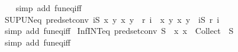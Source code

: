 \begin{isabellebody}
%
\isadelimproof
\ \ %
\endisadelimproof
%
\isatagproof
{}\isamarkupfalse%
\ {\isacharparenleft}{\kern0pt}simp\ add{\isacharcolon}{\kern0pt}\ fun{\isacharunderscore}{\kern0pt}eq{\isacharunderscore}{\kern0pt}iff{\isacharparenright}{\kern0pt}%
\endisatagproof
{\isafoldproof}%
%
\isadelimproof
\isanewline
%
\endisadelimproof
\isanewline
{}\isamarkupfalse%
\ SUP{\isacharunderscore}{\kern0pt}UN{\isacharunderscore}{\kern0pt}eq{}\ {\isacharbrackleft}{\kern0pt}pred{\isacharunderscore}{\kern0pt}set{\isacharunderscore}{\kern0pt}conv{\isacharbrackright}{\kern0pt}{\isacharcolon}{\kern0pt}\ {\isachardoublequoteopen}{\isacharparenleft}{\kern0pt}{\isasymSqunion}i{\isasymin}S{\isachardot}{\kern0pt}\ {\isacharparenleft}{\kern0pt}{\isasymlambda}x\ y{\isachardot}{\kern0pt}\ {\isacharparenleft}{\kern0pt}x{\isacharcomma}{\kern0pt}\ y{\isacharparenright}{\kern0pt}\ {\isasymin}\ r\ i{\isacharparenright}{\kern0pt}{\isacharparenright}{\kern0pt}\ {\isacharequal}{\kern0pt}\ {\isacharparenleft}{\kern0pt}{\isasymlambda}x\ y{\isachardot}{\kern0pt}\ {\isacharparenleft}{\kern0pt}x{\isacharcomma}{\kern0pt}\ y{\isacharparenright}{\kern0pt}\ {\isasymin}\ {\isacharparenleft}{\kern0pt}{\isasymUnion}i{\isasymin}S{\isachardot}{\kern0pt}\ r\ i{\isacharparenright}{\kern0pt}{\isacharparenright}{\kern0pt}{\isachardoublequoteclose}\isanewline
%
\isadelimproof
\ \ %
\endisadelimproof
%
\isatagproof
{}\isamarkupfalse%
\ {\isacharparenleft}{\kern0pt}simp\ add{\isacharcolon}{\kern0pt}\ fun{\isacharunderscore}{\kern0pt}eq{\isacharunderscore}{\kern0pt}iff{\isacharparenright}{\kern0pt}%
\endisatagproof
{\isafoldproof}%
%
\isadelimproof
\isanewline
%
\endisadelimproof
\isanewline
{}\isamarkupfalse%
\ Inf{\isacharunderscore}{\kern0pt}INT{\isacharunderscore}{\kern0pt}eq\ {\isacharbrackleft}{\kern0pt}pred{\isacharunderscore}{\kern0pt}set{\isacharunderscore}{\kern0pt}conv{\isacharbrackright}{\kern0pt}{\isacharcolon}{\kern0pt}\ {\isachardoublequoteopen}{\isasymSqinter}S\ {\isacharequal}{\kern0pt}\ {\isacharparenleft}{\kern0pt}{\isasymlambda}x{\isachardot}{\kern0pt}\ x\ {\isasymin}\ {\isacharparenleft}{\kern0pt}{\isasymInter}{\isacharparenleft}{\kern0pt}Collect\ {\isacharbackquote}{\kern0pt}\ S{\isacharparenright}{\kern0pt}{\isacharparenright}{\kern0pt}{\isacharparenright}{\kern0pt}{\isachardoublequoteclose}\isanewline
%
\isadelimproof
\ \ %
\endisadelimproof
%
\isatagproof
{}\isamarkupfalse%
\ {\isacharparenleft}{\kern0pt}simp\ add{\isacharcolon}{\kern0pt}\ fun{\isacharunderscore}{\kern0pt}eq{\isacharunderscore}{\kern0pt}iff{\isacharparenright}{\kern0pt}%

\end{isabellebody}
